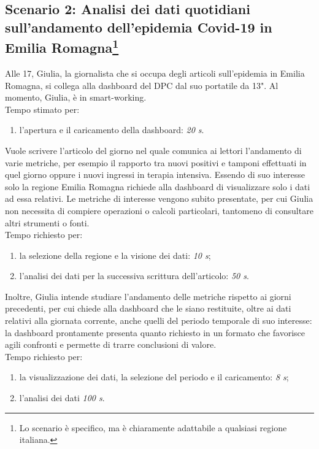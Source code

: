 \subsection[Scenario 2: Analisi dei dati quotidiani sull'andamento dell'epidemia Covid-19 in Emilia Romagna]{Scenario 2: Analisi dei dati quotidiani sull'andamento dell'epidemia Covid-19 in Emilia Romagna\footnote{Lo scenario è specifico, ma è chiaramente adattabile a qualsiasi regione italiana.}}
\label{ss:scenario-2}
Alle 17, Giulia, la giornalista che si occupa degli articoli sull'epidemia in Emilia Romagna, si collega alla dashboard del DPC dal suo portatile da 13". Al momento, Giulia, è in smart-working.\\
Tempo stimato per:
\begin{enumerate}
    \item l'apertura e il caricamento della dashboard: \textit{20 s}.
\end{enumerate}

\noindent
Vuole scrivere l'articolo del giorno nel quale comunica ai lettori l'andamento di varie metriche, per esempio il rapporto tra nuovi positivi e tamponi effettuati in quel giorno oppure i nuovi ingressi in terapia intensiva. Essendo di suo interesse solo la regione Emilia Romagna richiede alla dashboard di visualizzare solo i dati ad essa relativi. Le metriche di interesse vengono subito presentate, per cui Giulia non necessita di compiere operazioni o calcoli particolari, tantomeno di consultare altri strumenti o fonti.\\
Tempo richiesto per:
\begin{enumerate}
    \item la selezione della regione e la visione dei dati: \textit{10 s};
    \item l'analisi dei dati per la successiva scrittura dell'articolo: \textit{50 s}.
\end{enumerate}

\noindent
Inoltre, Giulia intende studiare l'andamento delle metriche rispetto ai giorni precedenti, per cui chiede alla dashboard che le siano restituite, oltre ai dati relativi alla giornata corrente, anche quelli del periodo temporale di suo interesse: la dashboard prontamente presenta quanto richiesto in un formato che favorisce agili confronti e permette di trarre conclusioni di valore.\\
Tempo richiesto per:
\begin{enumerate}
    \item la visualizzazione dei dati, la selezione del periodo e il caricamento: \textit{8 s};
    \item l'analisi dei dati \textit{100 s}.
\end{enumerate}

